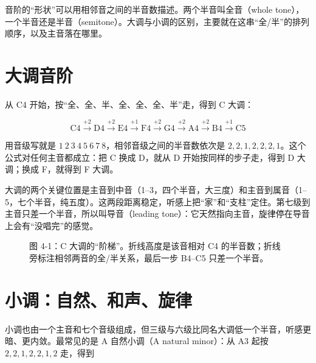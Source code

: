 音阶的“形状”可以用相邻音之间的半音数描述。两个半音叫全音（whole tone），一个半音还是半音（semitone）。大调与小调的区别，主要就在这串“全/半”的排列顺序，以及主音落在哪里。

\section{大调音阶}

从 C4 开始，按“全、全、半、全、全、全、半”走，得到 C 大调：

\[
\mathrm{C4 \xrightarrow{+2} D4 \xrightarrow{+2} E4 \xrightarrow{+1} F4
\xrightarrow{+2} G4 \xrightarrow{+2} A4 \xrightarrow{+2} B4 \xrightarrow{+1} C5}
\]

用音级写就是 \(1\ 2\ 3\ 4\ 5\ 6\ 7\ 8\)，相邻音级之间的半音数依次是 \(2,2,1,2,2,2,1\)。这个公式对任何主音都成立：把 C 换成 D，就从 D 开始按同样的步子走，得到 D 大调；换成 F，就得到 F 大调。

大调的两个关键位置是主音到中音（1–3，四个半音，大三度）和主音到属音（1–5，七个半音，纯五度）。这两段距离稳定，听感上把“家”和“支柱”定住。第七级到主音只差一个半音，所以叫导音（leading tone）：它天然指向主音，旋律停在导音上会有“没唱完”的感觉。

\begin{figure}[htbp]
\centering
{}

\small 图 4-1：C 大调的“阶梯”。折线高度是该音相对 C4 的半音数；折线旁标注相邻两音的全/半关系，最后一步 B4–C5 只差一个半音。
\end{figure}

\section{小调：自然、和声、旋律}

小调也由一个主音和七个音级组成，但三级与六级比同名大调低一个半音，听感更暗、更内敛。最常见的是 A 自然小调（A natural minor）：从 A3 起按 \(2,2,1,2,2,1,2\) 走，得到

